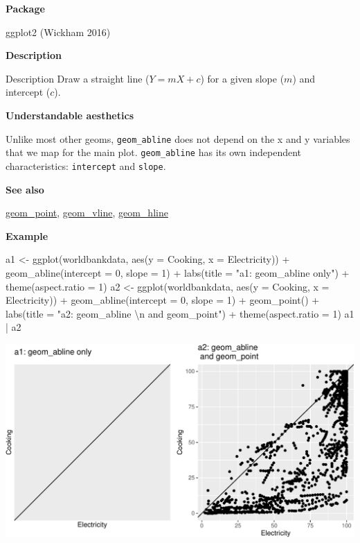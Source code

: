 \documentclass[
  letterpaper,
  DIV=11,
  numbers=noendperiod]{scrreprt}
\newenvironment{Shaded}{\begin{snugshade}}{\end{snugshade}}
\newcommand{\AttributeTok}[1]{\textcolor[rgb]{0.40,0.45,0.13}{#1}}
\newcommand{\DecValTok}[1]{\textcolor[rgb]{0.68,0.00,0.00}{#1}}
\newcommand{\FunctionTok}[1]{\textcolor[rgb]{0.28,0.35,0.67}{#1}}
\newcommand{\NormalTok}[1]{\textcolor[rgb]{0.00,0.23,0.31}{#1}}
\newcommand{\OtherTok}[1]{\textcolor[rgb]{0.00,0.23,0.31}{#1}}
\newcommand{\SpecialCharTok}[1]{\textcolor[rgb]{0.37,0.37,0.37}{#1}}
\newcommand{\StringTok}[1]{\textcolor[rgb]{0.13,0.47,0.30}{#1}}
\begin{document}
\textbf{Package}

ggplot2 (Wickham 2016)

\textbf{Description}

Description Draw a straight line (\(Y=mX+c\)) for a given slope (\(m\))
and intercept (\(c\)).

\textbf{Understandable aesthetics}

Unlike most other geoms, \texttt{geom\_abline} does not depend on the x
and y variables that we map for the main plot. \texttt{geom\_abline} has
its own independent characteristics: \texttt{intercept} and
\texttt{slope}.

\textbf{See also}

\hyperref[point]{geom\_point}, \hyperref[vline]{geom\_vline},
\hyperref[hline]{geom\_hline}

\textbf{Example}

\begin{Shaded}
\begin{Highlighting}[]
\NormalTok{a1 }\OtherTok{\textless{}{-}} \FunctionTok{ggplot}\NormalTok{(worldbankdata, }\FunctionTok{aes}\NormalTok{(}\AttributeTok{y =}\NormalTok{ Cooking, }\AttributeTok{x =}\NormalTok{ Electricity)) }\SpecialCharTok{+}
  \FunctionTok{geom\_abline}\NormalTok{(}\AttributeTok{intercept =} \DecValTok{0}\NormalTok{, }\AttributeTok{slope =} \DecValTok{1}\NormalTok{) }\SpecialCharTok{+}
  \FunctionTok{labs}\NormalTok{(}\AttributeTok{title =} \StringTok{"a1: geom\_abline only"}\NormalTok{) }\SpecialCharTok{+}
  \FunctionTok{theme}\NormalTok{(}\AttributeTok{aspect.ratio =} \DecValTok{1}\NormalTok{)}
\NormalTok{a2 }\OtherTok{\textless{}{-}} \FunctionTok{ggplot}\NormalTok{(worldbankdata, }\FunctionTok{aes}\NormalTok{(}\AttributeTok{y =}\NormalTok{ Cooking, }\AttributeTok{x =}\NormalTok{ Electricity)) }\SpecialCharTok{+}
  \FunctionTok{geom\_abline}\NormalTok{(}\AttributeTok{intercept =} \DecValTok{0}\NormalTok{, }\AttributeTok{slope =} \DecValTok{1}\NormalTok{) }\SpecialCharTok{+}
  \FunctionTok{geom\_point}\NormalTok{() }\SpecialCharTok{+}
  \FunctionTok{labs}\NormalTok{(}\AttributeTok{title =} \StringTok{"a2: geom\_abline }\SpecialCharTok{\textbackslash{}n}\StringTok{ and geom\_point"}\NormalTok{) }\SpecialCharTok{+}
  \FunctionTok{theme}\NormalTok{(}\AttributeTok{aspect.ratio =} \DecValTok{1}\NormalTok{)}
\NormalTok{a1 }\SpecialCharTok{|}\NormalTok{ a2}
\end{Highlighting}
\end{Shaded}

\includegraphics{a_files/figure-pdf/unnamed-chunk-2-1.pdf}
\end{document}
